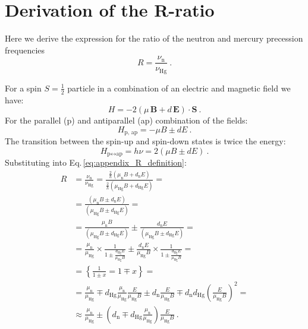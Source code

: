 \chapter{Derivation of the R-ratio}
\label{ch:R_derivation_appendix}

Here we derive the expression for the ratio of the neutron and mercury precession frequencies
\begin{equation}
  R = \frac{\nu_\text{n}}{\nu_\text{Hg}} \ .
  \label{eq:appendix_R_definition}
\end{equation}

For a spin $S = \tfrac{1}{2}$ particle in a combination of an electric and magnetic field we have:
\begin{equation}
  H = - 2 \left( \mu \, \mathbf{B} + d \, \mathbf{E} \right ) \cdot \mathbf{S} \ .
\end{equation}
For the parallel (p) and antiparallel (ap) combination of the fields:
\begin{equation}
  H_\text{p, ap} = - \mu B \pm d E \ .
\end{equation}
The transition between the spin-up and spin-down states is twice the energy:
\begin{equation}
  H_{\text{p} \leftrightarrow \text{ap} } = h \nu = 2 \left( \mu B \pm d E \right) \ .
\end{equation}
Substituting into Eq.\,\ref{eq:appendix_R_definition}:
\begin{align}
  R &= \frac{\nu_\text{n}}{\nu_\text{Hg}} = \frac{ \frac{2}{h} \left( \mu_\text{n} B + d_\text{n} E \right) }{ \frac{2}{h} \left( \mu_\text{Hg} B + d_\text{Hg} E \right) } = \nonumber \\
      &= \frac{ \left( \mu_\text{n} B \pm d_\text{n} E \right) }{ \left( \mu_\text{Hg} B \pm d_\text{Hg} E \right) } = \nonumber \\
      &= \frac{ \mu_\text{n} B }{ \left( \mu_\text{Hg} B \pm d_\text{Hg} E \right) } \pm \frac{ d_\text{n} E }{ \left( \mu_\text{Hg} B \pm d_\text{Hg} E \right) } = \nonumber \\
      &= \frac{\mu_\text{n}}{\mu_\text{Hg}} \times \frac{1}{ 1 \pm \frac{d_\text{Hg} E}{\mu_\text{Hg} B} } \pm \frac{d_\text{n} E}{\mu_\text{Hg} B} \times \frac{1}{1 \pm \frac{ d_\text{Hg} E }{ \mu_\text{Hg} B}} = \nonumber \\
      &= \left\{ \frac{1}{1 \pm x} = 1 \mp x \right\} = \nonumber \\
      &= \frac{\mu_\text{n}}{\mu_\text{Hg}} \mp d_\text{Hg} \frac{\mu_\text{n}}{\mu_\text{Hg}} \frac{E}{\mu_\text{Hg} B} \pm d_\text{n} \frac{E}{\mu_\text{Hg} B} \mp d_\text{n} d_\text{Hg} {\left( \frac{E}{\mu_\text{Hg} B} \right)}^2 = \\
      &\approx \frac{\mu_\text{n}}{\mu_\text{Hg}} \pm \left( d_\text{n} \mp  d_\text{Hg} \frac{\mu_\text{n}}{\mu_\text{Hg}} \right) \frac{E}{\mu_\text{Hg} B} \ .
\end{align}
